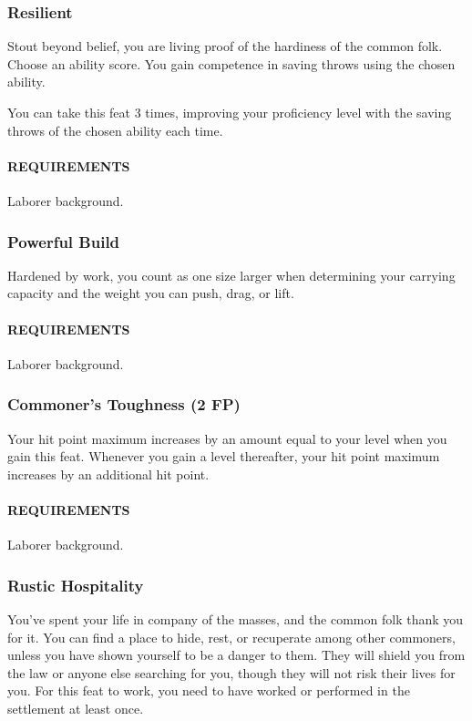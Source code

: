     \subsubsection{Resilient} \label{feat::resilient}
        Stout beyond belief, you are living proof of the hardiness of the common folk.
        Choose an ability score.
        You gain competence in saving throws using the chosen ability.

        You can take this feat 3 times, improving your proficiency level with the saving throws of the chosen ability each time.
        \paragraph{REQUIREMENTS} Laborer background.

    \subsubsection{Powerful Build} \label{feat::powerfulbuild}
        Hardened by work, you count as one size larger when determining your carrying capacity and the weight you can push, drag, or lift.
        \paragraph{REQUIREMENTS} Laborer background.

    \subsubsection{Commoner's Toughness (2 FP)} \label{feat::commonerstoughness}
        Your hit point maximum increases by an amount equal to your level when you gain this feat.
        Whenever you gain a level thereafter, your hit point maximum increases by an additional hit point.
        \paragraph{REQUIREMENTS} Laborer background.

    \subsubsection{Rustic Hospitality} \label{feat::rustichospitality}
        You've spent your life in company of the masses, and the common folk thank you for it.
        You can find a place to hide, rest, or recuperate among other commoners, unless you have shown yourself to be a danger to them.
        They will shield you from the law or anyone else searching for you, though they will not risk their lives for you.
        For this feat to work, you need to have worked or performed in the settlement at least once.

